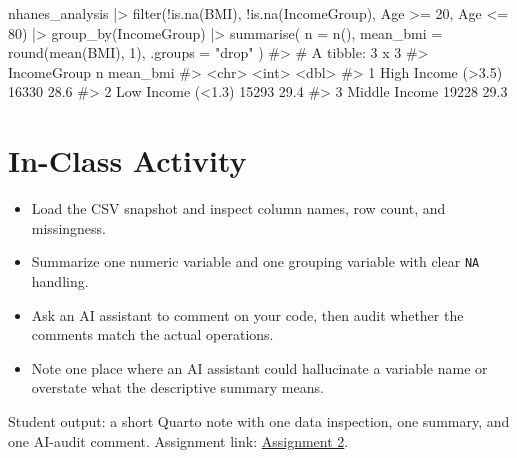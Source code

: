 \documentclass[
  letterpaper,
  DIV=11,
  numbers=noendperiod,
  oneside]{scrreprt}
\newenvironment{Shaded}{\begin{snugshade}}{\end{snugshade}}
\newcommand{\AttributeTok}[1]{\textcolor[rgb]{0.40,0.45,0.13}{#1}}
\newcommand{\CommentTok}[1]{\textcolor[rgb]{0.37,0.37,0.37}{#1}}
\newcommand{\DecValTok}[1]{\textcolor[rgb]{0.68,0.00,0.00}{#1}}
\newcommand{\FunctionTok}[1]{\textcolor[rgb]{0.28,0.35,0.67}{#1}}
\newcommand{\NormalTok}[1]{\textcolor[rgb]{0.00,0.23,0.31}{#1}}
\newcommand{\SpecialCharTok}[1]{\textcolor[rgb]{0.37,0.37,0.37}{#1}}
\newcommand{\StringTok}[1]{\textcolor[rgb]{0.13,0.47,0.30}{#1}}
\providecommand{\tightlist}{%
  \setlength{\itemsep}{0pt}\setlength{\parskip}{0pt}}
\begin{document}
\begin{Shaded}
\begin{Highlighting}[numbers=left,,]
\NormalTok{nhanes\_analysis }\SpecialCharTok{|\textgreater{}}
  \FunctionTok{filter}\NormalTok{(}\SpecialCharTok{!}\FunctionTok{is.na}\NormalTok{(BMI), }\SpecialCharTok{!}\FunctionTok{is.na}\NormalTok{(IncomeGroup), Age }\SpecialCharTok{\textgreater{}=} \DecValTok{20}\NormalTok{, Age }\SpecialCharTok{\textless{}=} \DecValTok{80}\NormalTok{) }\SpecialCharTok{|\textgreater{}}
  \FunctionTok{group\_by}\NormalTok{(IncomeGroup) }\SpecialCharTok{|\textgreater{}}
  \FunctionTok{summarise}\NormalTok{(}
    \AttributeTok{n =} \FunctionTok{n}\NormalTok{(),}
    \AttributeTok{mean\_bmi =} \FunctionTok{round}\NormalTok{(}\FunctionTok{mean}\NormalTok{(BMI), }\DecValTok{1}\NormalTok{),}
    \AttributeTok{.groups =} \StringTok{"drop"}
\NormalTok{  )}
\CommentTok{\#\textgreater{} \# A tibble: 3 x 3}
\CommentTok{\#\textgreater{}   IncomeGroup            n mean\_bmi}
\CommentTok{\#\textgreater{}   \textless{}chr\textgreater{}              \textless{}int\textgreater{}    \textless{}dbl\textgreater{}}
\CommentTok{\#\textgreater{} 1 High Income (\textgreater{}3.5) 16330     28.6}
\CommentTok{\#\textgreater{} 2 Low Income (\textless{}1.3)  15293     29.4}
\CommentTok{\#\textgreater{} 3 Middle Income      19228     29.3}
\end{Highlighting}
\end{Shaded}

\section*{In-Class Activity}\label{in-class-activity-2}


\begin{itemize}
\tightlist
\item
  Load the CSV snapshot and inspect column names, row count, and
  missingness.
\item
  Summarize one numeric variable and one grouping variable with clear
  \texttt{NA} handling.
\item
  Ask an AI assistant to comment on your code, then audit whether the
  comments match the actual operations.
\item
  Note one place where an AI assistant could hallucinate a variable name
  or overstate what the descriptive summary means.
\end{itemize}

Student output: a short Quarto note with one data inspection, one
summary, and one AI-audit comment. Assignment link:
\href{../../assignments/assignment02-r-with-ai/README.md}{Assignment 2}.
\end{document}
